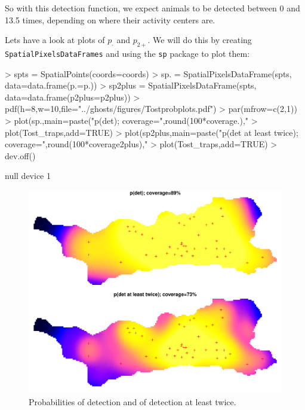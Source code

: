 \documentclass{article}
\begin{document}
So with this detection function, we expect animals to be detected between 0 and 13.5 times, depending on where their activity centers are.

Lets have a look at plots of $p_\cdot$ and $p_{2+}$. We will do this by creating \texttt{SpatialPixelsDataFrames} and using the \texttt{sp} package to plot them:

\begin{Schunk}
\begin{Sinput}
> spts = SpatialPoints(coords=coords)
> sp. = SpatialPixelsDataFrame(spts, data=data.frame(p.=p.))
> sp2plus = SpatialPixelsDataFrame(spts, data=data.frame(p2plus=p2plus))
> pdf(h=8,w=10,file="../ghosts/figures/Tostprobplots.pdf")
> par(mfrow=c(2,1))
> plot(sp.,main=paste("p(det); coverage=",round(100*coverage.),"%
> plot(Tost_traps,add=TRUE)
> plot(sp2plus,main=paste("p(det at least twice); coverage=",round(100*coverage2plus),"%
> plot(Tost_traps,add=TRUE)
> dev.off()
\end{Sinput}
\begin{Soutput}
null device 
          1 
\end{Soutput}
\end{Schunk}


\begin{figure}
\begin{centering}
\includegraphics[width=14cm]{../ghosts/figures/Tostprobplots.pdf}
\caption{Probabilities of detection and of detection at least twice.}
\label{fig:Tostprobplots}
\end{centering}
\end{figure}
\end{document}

